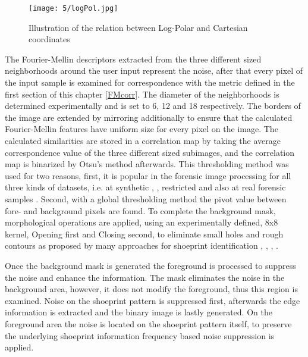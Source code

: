 \documentclass[draft,final]{vutinfth} %
\begin{document}
\begin{figure}[h]
  \centering
  \texttt{[image: 5/logPol.jpg]}
  \caption{Illustration of the relation between Log-Polar and Cartesian coordinates \cite{sarvaiya2012image}}
  \label{fig:sans:logPol} %
\end{figure}

\par
The Fourier-Mellin descriptors extracted from the three different sized neighborhoods around the user input represent the noise, after that every pixel of the input sample is examined for correspondence with the metric defined in the first section of this chapter \ref{FMcorr}.
The diameter of the neighborhoods is determined experimentally and is set to 6, 12 and 18 respectively.
The borders of the image are extended by mirroring additionally to ensure that the calculated Fourier-Mellin features have uniform size for every pixel on the image.
The calculated similarities are stored in a correlation map by taking the average correspondence value of the three different sized subimages, and the correlation map is binarized by Otsu's method afterwards.
This thresholding method was used for two reasons, first, it is popular in the forensic image processing for all three kinds of datasets, i.e. at synthetic \cite{algarni2008novel}, \cite{alizadeh2017automatic}, restricted \cite{kong2014novel} and also at real forensic samples \cite{wu2019crime}.
Second, with a global thresholding method the pivot value between fore- and background pixels are found.
To complete the background mask, morphological operations are applied, using an experimentally defined, 8x8 kernel, Opening first and Closing second, to eliminate small holes and rough contours as proposed by many approaches for shoeprint identification \cite{wang2014automatic}, \cite{kong2014novel}, \cite{li2014retrieval}, \cite{tang2010footwear}.
\par
Once the background mask is generated the foreground is processed to suppress the noise and enhance the information.
The mask eliminates the noise in the background area, however, it does not modify the foreground, thus this region is examined.
Noise on the shoeprint pattern is suppressed first, afterwards the edge information is extracted and the binary image is lastly generated.
On the foreground area the noise is located on the shoeprint pattern itself, to preserve the underlying shoeprint information frequency based noise suppression is applied.
\end{document}
